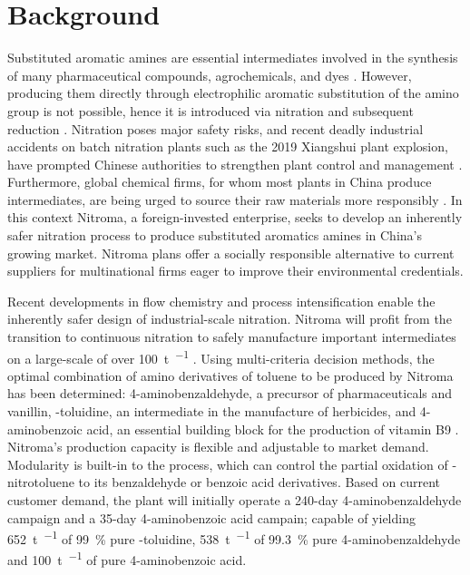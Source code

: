 \section*{Background}

Substituted aromatic amines are essential intermediates involved in the synthesis of many pharmaceutical compounds, agrochemicals, and dyes \cite{vogt_amines_2000}. However, producing them directly through electrophilic aromatic substitution of the amino group is not possible, hence it is introduced via nitration and subsequent reduction \cite{dugal_nitrobenzene_2005}. Nitration poses major safety risks, and recent deadly industrial accidents on batch nitration plants such as the 2019 Xiangshui plant explosion, have prompted Chinese authorities to strengthen plant control and management \cite{el_diario_china_2019}. Furthermore, global chemical firms, for whom most plants in China produce intermediates, are being urged to source their raw materials more responsibly \cite{stanway_global_2019}.
In this context Nitroma, a foreign-invested enterprise, seeks to develop an inherently safer nitration process to produce substituted aromatics amines in China's growing market. Nitroma plans offer a socially responsible alternative to current suppliers for multinational firms eager to improve their environmental credentials. 

Recent developments in flow chemistry and process intensification enable the inherently safer design of industrial-scale nitration. Nitroma will profit from the transition to continuous nitration to safely manufacture important intermediates on a large-scale of over \SI{100}{\tonne\per\year} \cite{di_miceli_raimondi_safety_2015}. Using multi-criteria decision methods, the optimal combination of amino derivatives of toluene to be produced by Nitroma has been determined: 4-aminobenzaldehyde, a precursor of pharmaceuticals and vanillin, \ortho-toluidine, an intermediate in the manufacture of herbicides, and 4-aminobenzoic acid, an essential building block for the production of vitamin B9 \cite{bowers_toluidines_2000,bruhne_benzaldehyde_2011,maki_benzoic_2000}.
Nitroma's production capacity is flexible and adjustable to market demand. Modularity is built-in to the process, which can control the partial oxidation of \para-nitrotoluene to its benzaldehyde or benzoic acid derivatives. Based on current customer demand, the plant will initially operate a 240-day 4-amino\-benz\-aldehyde campaign and a 35-day 4-amino\-benzoic acid campain; capable of yielding \SI{652}{\tonne\per\year} of \SI{99}{\percent} pure \ortho-toluidine, \SI{538}{\tonne\per\year} of \SI{99.3}{\percent} pure 4-amino\-benz\-aldehyde and \SI{100}{\tonne\per\year} of pure 4-amino\-benzoic acid.

